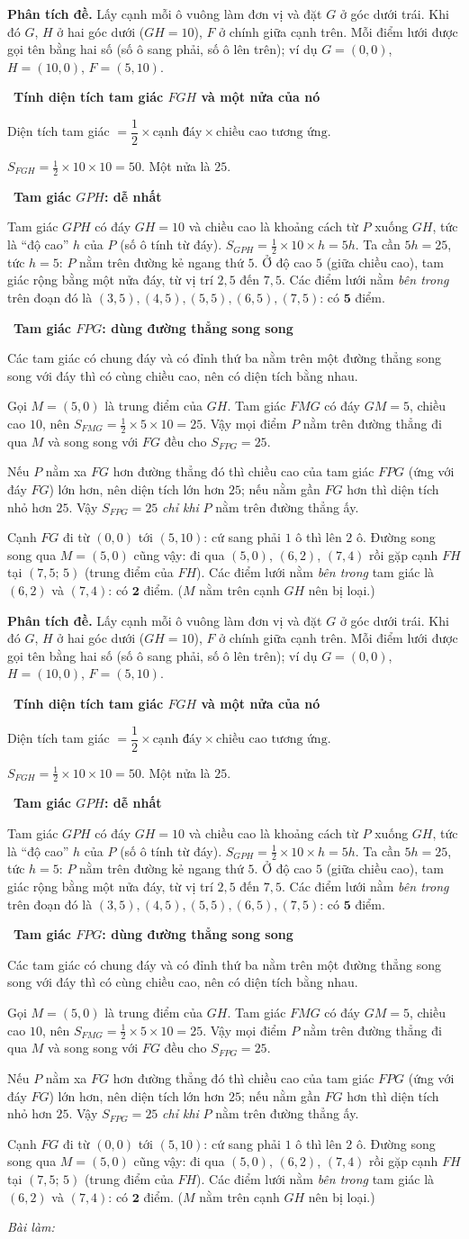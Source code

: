 \documentclass[11pt]{article}
\newif\ifsol \soltrue
\newcommand{\probsol}[1]{%
  \begin{lrbox}{\solmeasure}\begin{minipage}{\dimexpr\linewidth-24pt\relax}#1\end{minipage}\end{lrbox}%
  \ifsol
    \begin{solbox}#1\end{solbox}%
  \else
    \setlength{\solht}{\dimexpr\ht\solmeasure+\dp\solmeasure+0.85cm\relax}%
    \ifdim\solht<1.35cm\setlength{\solht}{1.35cm}\fi
    \ifdim\solht>\StudentMaxWork\setlength{\solht}{\StudentMaxWork}\fi
    \begin{tcolorbox}[colback=white,colframe=Line,boxrule=0.8pt,arc=5pt,
      left=8pt,right=8pt,top=4pt,bottom=4pt,height=\solht]{\footnotesize\color{Slate}\itshape\WorkWord}\end{tcolorbox}%
  \fi}
\newlength{\StudentMaxWork}\setlength{\StudentMaxWork}{7.5cm}
\newcommand{\step}[2]{\par\smallskip\noindent{\bfseries\color{tmBlue!85!black}\StepWord~#1.}\ {\bfseries #2}\par\nopagebreak}
\def\WorkWord{Bài làm:}
\def\StepWord{Bước}
\begin{document}
\probsol{
\textbf{Phân tích đề.} Lấy cạnh mỗi ô vuông làm đơn vị và đặt $G$ ở góc dưới trái. Khi đó $G$, $H$ ở hai góc dưới
($GH=10$), $F$ ở chính giữa cạnh trên. Mỗi điểm lưới được gọi tên bằng hai số (số ô sang phải, số ô lên trên); ví dụ
$G=(0,0)$, $H=(10,0)$, $F=(5,10)$.

\step{1}{Tính diện tích tam giác $FGH$ và một nửa của nó}
\begin{recallbox}Diện tích tam giác $=\dfrac12\times\text{cạnh đáy}\times\text{chiều cao tương ứng}$.\end{recallbox}
$S_{FGH}=\frac12\times10\times10=50$. Một nửa là $25$.

\step{2}{Tam giác $GPH$: dễ nhất}
Tam giác $GPH$ có đáy $GH=10$ và chiều cao là khoảng cách từ $P$ xuống $GH$, tức là ``độ cao'' $h$ của $P$
(số ô tính từ đáy). $S_{GPH}=\frac12\times10\times h=5h$. Ta cần $5h=25$, tức $h=5$: $P$ nằm trên đường kẻ ngang
thứ $5$. Ở độ cao $5$ (giữa chiều cao), tam giác rộng bằng một nửa đáy, từ vị trí $2{,}5$ đến $7{,}5$. Các điểm lưới
nằm \emph{bên trong} trên đoạn đó là $(3,5),(4,5),(5,5),(6,5),(7,5)$: có $\mathbf{5}$ điểm.

\step{3}{Tam giác $FPG$: dùng đường thẳng song song}
\begin{recallbox}Các tam giác có chung đáy và có đỉnh thứ ba nằm trên một đường thẳng song song với đáy thì có
cùng chiều cao, nên có diện tích bằng nhau.\end{recallbox}
Gọi $M=(5,0)$ là trung điểm của $GH$. Tam giác $FMG$ có đáy $GM=5$, chiều cao $10$, nên $S_{FMG}=\frac12\times5\times10=25$.
Vậy mọi điểm $P$ nằm trên đường thẳng đi qua $M$ và song song với $FG$ đều cho $S_{FPG}=25$.
\begin{proofbox}Nếu $P$ nằm xa $FG$ hơn đường thẳng đó thì chiều cao của tam giác $FPG$ (ứng với đáy $FG$) lớn hơn, nên
diện tích lớn hơn $25$; nếu nằm gần $FG$ hơn thì diện tích nhỏ hơn $25$. Vậy $S_{FPG}=25$ \emph{chỉ khi} $P$ nằm trên
đường thẳng ấy.\end{proofbox}
Cạnh $FG$ đi từ $(0,0)$ tới $(5,10)$: cứ sang phải $1$ ô thì lên $2$ ô. Đường song song qua $M=(5,0)$ cũng vậy:
đi qua $(5,0)$, $(6,2)$, $(7,4)$ rồi gặp cạnh $FH$ tại $(7{,}5;\,5)$ (trung điểm của $FH$). Các điểm lưới nằm
\emph{bên trong} tam giác là $(6,2)$ và $(7,4)$: có $\mathbf{2}$ điểm. ($M$ nằm trên cạnh $GH$ nên bị loại.)

}
\end{document}
